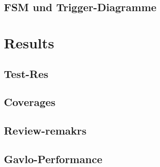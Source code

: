	\section{FSM und Trigger-Diagramme}
	
\chapter{Results}
\label{cha:Results}
	\section{Test-Res}
	\section{Coverages}
	\section{Review-remakrs}
	\section{Gavlo-Performance}
	

